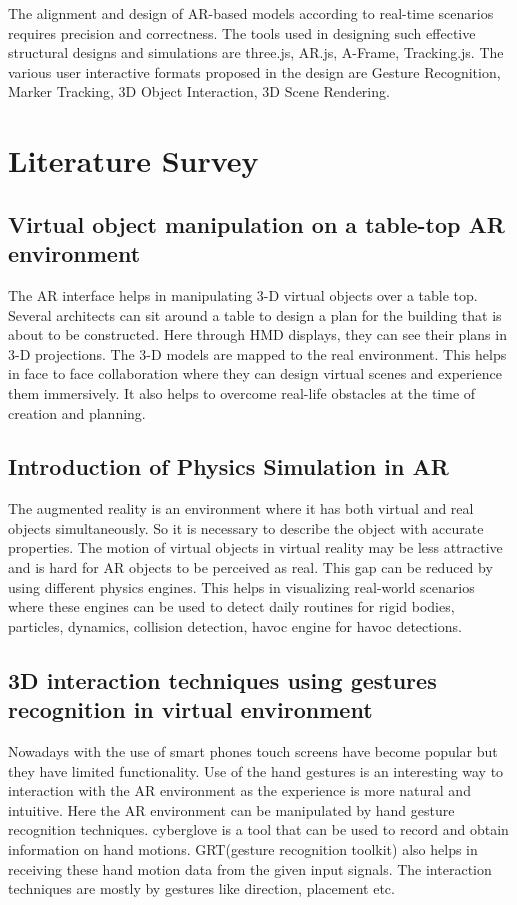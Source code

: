 \documentclass[conference]{IEEEtran}
\begin{document}
The alignment and design of AR-based models according to real-time scenarios requires precision and correctness. The tools used in designing such effective structural designs and simulations are three.js, AR.js, A-Frame, Tracking.js. The various user interactive formats proposed in the design are Gesture Recognition, Marker Tracking, 3D Object Interaction, 3D Scene Rendering.
\section{Literature Survey}
\subsection{Virtual object manipulation on a table-top AR environment}
The AR interface helps in manipulating 3-D virtual objects over a table top\cite{tabletop}. Several architects can sit around a table to design a plan for the building that is about to be constructed. Here through HMD displays, they can see their plans in 3-D projections. The 3-D models are mapped to the real environment. This helps in face to face collaboration where they can design virtual scenes and experience them immersively. It also helps to overcome real-life obstacles at the time of creation and planning. 

\subsection{Introduction of Physics Simulation in AR}
The augmented reality is an environment where it has both virtual and real objects simultaneously. So it is necessary to describe the object with accurate properties. The motion of virtual objects in virtual reality may be less attractive and is hard for AR objects to be perceived as real. This gap can be reduced by using different physics engines. This helps in visualizing real-world scenarios where these engines can be used to detect daily routines for rigid bodies, particles, dynamics, collision detection, havoc engine for havoc detections\cite{introphysics}.

\subsection{3D interaction techniques using gestures recognition in virtual environment}
Nowadays with the use of smart phones touch screens have become popular but they have limited functionality. Use of the hand gestures is an interesting way to interaction with the AR environment as the experience is more natural and intuitive. Here the AR environment can be manipulated by hand gesture recognition techniques\cite{gestureinteraction}. cyberglove is a tool that can be used to record and obtain information on hand motions. GRT(gesture recognition toolkit) also helps in receiving these hand motion data from the given input signals. The interaction techniques are mostly by gestures like direction, placement etc.
\end{document}

